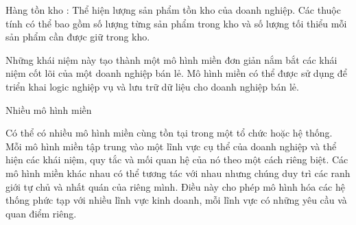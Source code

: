 Hàng tồn kho : Thể hiện lượng sản phẩm tồn kho của doanh nghiệp. Các thuộc tính có thể bao gồm số lượng từng sản phẩm trong kho và số lượng tối thiểu mỗi sản phẩm cần được giữ trong kho.

Những khái niệm này tạo thành một mô hình miền đơn giản nắm bắt các khái niệm cốt lõi của một doanh nghiệp bán lẻ. Mô hình miền có thể được sử dụng để triển khai logic nghiệp vụ và lưu trữ dữ liệu cho doanh nghiệp bán lẻ.

Nhiều mô hình miền

Có thể có nhiều mô hình miền cùng tồn tại trong một tổ chức hoặc hệ thống. Mỗi mô hình miền tập trung vào một lĩnh vực cụ thể của doanh nghiệp và thể hiện các khái niệm, quy tắc và mối quan hệ của nó theo một cách riêng biệt. Các mô hình miền khác nhau có thể tương tác với nhau nhưng chúng duy trì các ranh giới tự chủ và nhất quán của riêng mình. Điều này cho phép mô hình hóa các hệ thống phức tạp với nhiều lĩnh vực kinh doanh, mỗi lĩnh vực có những yêu cầu và quan điểm riêng.










